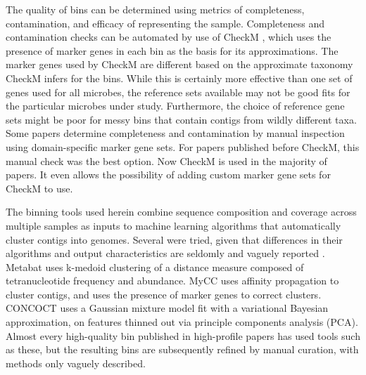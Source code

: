 The quality of bins can be determined using metrics of completeness, contamination, and efficacy of representing the sample.
Completeness and contamination checks can be automated by use of CheckM \cite{parks2015}, which uses the presence of marker genes in each bin as the basis for its approximations.
The marker genes used by CheckM are different based on the approximate taxonomy CheckM infers for the bins.
While this is certainly more effective than one set of genes used for all microbes, the reference sets available may not be good fits for the particular microbes under study.
Furthermore, the choice of reference gene sets might be poor for messy bins that contain contigs from wildly different taxa.
Some papers determine completeness and contamination by manual inspection using domain-specific marker gene sets. %
For papers published before CheckM, this manual check was the best option.
Now CheckM is used in the majority of papers.
It even allows the possibility of adding custom marker gene sets for CheckM to use.

The binning tools used herein combine sequence composition and coverage across multiple samples as inputs to machine learning algorithms that automatically cluster contigs into genomes.
Several were tried, given that differences in their algorithms and output characteristics are seldomly and vaguely reported \cite{sangwan2016}.
Metabat \cite{metabat2015} uses k-medoid clustering of a distance measure composed of tetranucleotide frequency and abundance.
MyCC \cite{mycc2016} uses affinity propagation to cluster contigs, and uses the presence of marker genes to correct clusters.
CONCOCT \cite{concoct2014} uses a Gaussian mixture model fit with a variational Bayesian approximation, on features thinned out via principle components analysis (PCA).
Almost every high-quality bin published in high-profile papers has used tools such as these, but the resulting bins are subsequently refined by manual curation, with methods only vaguely described.

